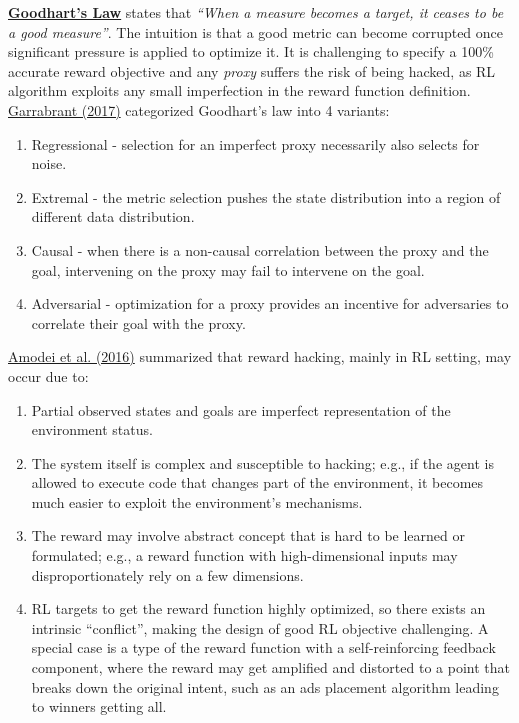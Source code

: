 \href{https://en.wikipedia.org/wiki/Goodhart\%27s_law}{\textbf{Goodhart's Law}} states that \emph{``When a measure becomes a target, it ceases to be a good measure''}. The intuition is that a good metric can become corrupted once significant pressure is applied to optimize it. It is challenging to specify a 100\% accurate reward objective and any \emph{proxy} suffers the risk of being hacked, as RL algorithm exploits any small imperfection in the reward function definition. \href{https://www.lesswrong.com/posts/EbFABnst8LsidYs5Y/goodhart-taxonomy}{Garrabrant (2017)} categorized Goodhart's law into 4 variants:

\begin{enumerate}
\tightlist
\item
  Regressional - selection for an imperfect proxy necessarily also selects for noise.
\item
  Extremal - the metric selection pushes the state distribution into a region of different data distribution.
\item
  Causal - when there is a non-causal correlation between the proxy and the goal, intervening on the proxy may fail to intervene on the goal.
\item
  Adversarial - optimization for a proxy provides an incentive for adversaries to correlate their goal with the proxy.
\end{enumerate}

\href{https://arxiv.org/abs/1606.06565}{Amodei et al. (2016)} summarized that reward hacking, mainly in RL setting, may occur due to:

\begin{enumerate}
\tightlist
\item
  Partial observed states and goals are imperfect representation of the environment status.
\item
  The system itself is complex and susceptible to hacking; e.g., if the agent is allowed to execute code that changes part of the environment, it becomes much easier to exploit the environment's mechanisms.
\item
  The reward may involve abstract concept that is hard to be learned or formulated; e.g., a reward function with high-dimensional inputs may disproportionately rely on a few dimensions.
\item
  RL targets to get the reward function highly optimized, so there exists an intrinsic ``conflict'', making the design of good RL objective challenging. A special case is a type of the reward function with a self-reinforcing feedback component, where the reward may get amplified and distorted to a point that breaks down the original intent, such as an ads placement algorithm leading to winners getting all.
\end{enumerate}


